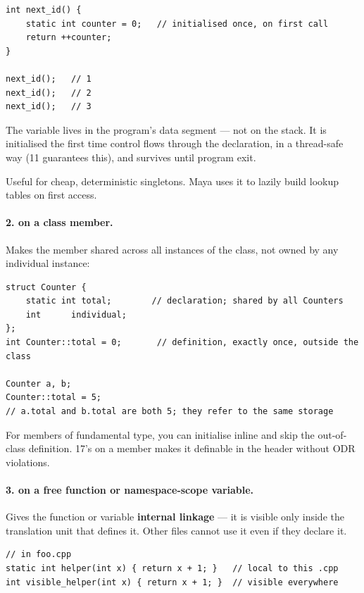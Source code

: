 \begin{lstlisting}
int next_id() {
    static int counter = 0;   // initialised once, on first call
    return ++counter;
}

next_id();   // 1
next_id();   // 2
next_id();   // 3
\end{lstlisting}

The  variable lives in the program's data segment ---
not on the stack. It is initialised the first time control flows
through the declaration, in a thread-safe way (\cpp{}11 guarantees
this), and survives until program exit.

Useful for cheap, deterministic singletons. Maya uses it to lazily
build lookup tables on first access.

\paragraph{2.  on a class member.}
Makes the member shared across all instances of the class, not
owned by any individual instance:

\begin{lstlisting}
struct Counter {
    static int total;        // declaration; shared by all Counters
    int      individual;
};
int Counter::total = 0;       // definition, exactly once, outside the class

Counter a, b;
Counter::total = 5;
// a.total and b.total are both 5; they refer to the same storage
\end{lstlisting}

For  members of fundamental type, you can
initialise inline and skip the out-of-class definition. \cpp{}17's
 on a  member makes it definable in the
header without ODR violations.

\paragraph{3.  on a free function or namespace-scope variable.}
Gives the function or variable \textbf{internal linkage} --- it is
visible only inside the translation unit that defines it. Other
files cannot use it even if they declare it.

\begin{lstlisting}
// in foo.cpp
static int helper(int x) { return x + 1; }   // local to this .cpp
int visible_helper(int x) { return x + 1; }  // visible everywhere
\end{lstlisting}

